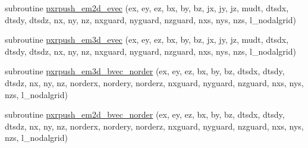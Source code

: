 \begin{DoxyCompactItemize}
\item 
subroutine \hyperlink{maxwell_8_f90_a01c2f64a5f5af4a45211d953513ab83c}{pxrpush\+\_\+em2d\+\_\+evec} (ex, ey, ez, bx, by, bz, jx, jy, jz, mudt,                                                                                                                                           dtsdx, dtsdy, dtsdz, nx, ny, nz,                                                                                                                                                                   nxguard, nyguard, nzguard, nxs, nys, nzs,                                                                                                                               l\+\_\+nodalgrid)
\item 
subroutine \hyperlink{maxwell_8_f90_a8ef50be383218786e3b8237260966584}{pxrpush\+\_\+em3d\+\_\+evec} (ex, ey, ez, bx, by, bz, jx, jy, jz, mudt,                                                                                                                                           dtsdx, dtsdy, dtsdz, nx, ny, nz,                                                                                                                                                                   nxguard, nyguard, nzguard, nxs, nys, nzs,                                                                                                                               l\+\_\+nodalgrid)
\item 
subroutine \hyperlink{maxwell_8_f90_afa9094788eaf34260a77ee6eed4ee137}{pxrpush\+\_\+em3d\+\_\+bvec\+\_\+norder} (ex, ey, ez, bx, by, bz,                                                                                                                                                                                               dtsdx, dtsdy, dtsdz, nx, ny, nz,                                                                                                                                                               norderx, nordery, norderz,                                                                                                                                                                           nxguard, nyguard, nzguard, nxs, nys, nzs,                                                                                                                           l\+\_\+nodalgrid)
\item 
subroutine \hyperlink{maxwell_8_f90_a435d8f4834d6aee06dc2969a84d4ce86}{pxrpush\+\_\+em2d\+\_\+bvec\+\_\+norder} (ex, ey, ez, bx, by, bz,                                                                                                                                                                                               dtsdx, dtsdy, dtsdz, nx, ny, nz,                                                                                                                                                               norderx, nordery, norderz,                                                                                                                                                                           nxguard, nyguard, nzguard, nxs, nys, nzs,                                                                                                                           l\+\_\+nodalgrid)

\end{DoxyCompactItemize}
